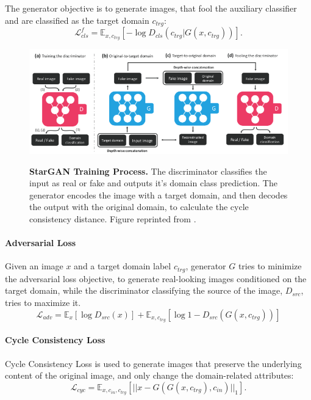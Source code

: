 \documentclass[12pt]{report}
\begin{document}
The generator objective is to generate images, that fool the auxiliary classifier and are classified as the target domain $c_{trg}$:
\begin{equation}
\mathcal{L}^{f}_{cls} = \mathbb{E}_{x,c_{trg}}[-\log D_{cls}(c_{trg}|G(x, c_{trg}))].
\label{eq:stargan_clsf}
\end{equation}

\begin{figure}[h]
\centering
{\includegraphics[width=\linewidth]{03_analysis/gans/stargan}}
\caption{\label{fig:stargan_topo} \textbf{StarGAN Training Process.} The discriminator classifies the input as real or fake and outputs it's domain class prediction. The generator encodes the image with a target domain, and then decodes the output with the original domain, to calculate the cycle consistency distance. Figure reprinted from \cite{choi_stargan_2017}.}
\end{figure}

\paragraph{Adversarial Loss}
Given an image $x$ and a target domain label $c_{trg}$, generator $G$ tries to minimize the adversarial loss objective, to generate real-looking images conditioned on the target domain, while the discriminator classifying the source of the image, $D_{src}$, tries to maximize it.
\begin{equation}
\mathcal{L}_{adv} = \mathbb{E}_{x}[\log D_{src}(x)] + \mathbb{E}_{x, c_{trg}}[\log 1 - D_{src}(G(x, c_{trg}))]
\label{eq:stargan_adv}
\end{equation}

\paragraph{Cycle Consistency Loss}
Cycle Consistency Loss \cite{zhu_unpaired_2017} is used to generate images that preserve the underlying content of the original image, and only change the domain-related attributes:
\begin{equation}
\mathcal{L}_{cyc} = \mathbb{E}_{x,c_{in},c_{trg}}[||x - G(G(x,c_{trg}), c_{in})||_{1}].
\label{eq:stargan_cyc}
\end{equation}
\end{document}
